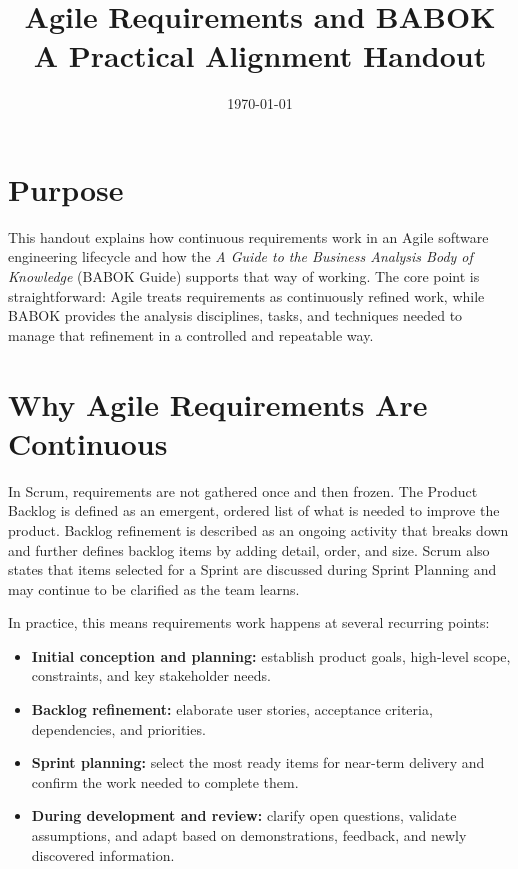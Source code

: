 \documentclass[11pt]{article}
\title{Agile Requirements and BABOK\\\large A Practical Alignment Handout}
\author{}
\date{\today}
\begin{document}
\maketitle

\section{Purpose}

This handout explains how continuous requirements work in an Agile software engineering lifecycle and how the \emph{A Guide to the Business Analysis Body of Knowledge} (BABOK Guide) supports that way of working. The core point is straightforward: Agile treats requirements as continuously refined work, while BABOK provides the analysis disciplines, tasks, and techniques needed to manage that refinement in a controlled and repeatable way.\cite{scrumguide,babokmain,babokstructure}

\section{Why Agile Requirements Are Continuous}

In Scrum, requirements are not gathered once and then frozen. The Product Backlog is defined as an emergent, ordered list of what is needed to improve the product. Backlog refinement is described as an ongoing activity that breaks down and further defines backlog items by adding detail, order, and size. Scrum also states that items selected for a Sprint are discussed during Sprint Planning and may continue to be clarified as the team learns.\cite{scrumguide}

In practice, this means requirements work happens at several recurring points:

\begin{itemize}
  \item \textbf{Initial conception and planning:} establish product goals, high-level scope, constraints, and key stakeholder needs.
  \item \textbf{Backlog refinement:} elaborate user stories, acceptance criteria, dependencies, and priorities.
  \item \textbf{Sprint planning:} select the most ready items for near-term delivery and confirm the work needed to complete them.
  \item \textbf{During development and review:} clarify open questions, validate assumptions, and adapt based on demonstrations, feedback, and newly discovered information.
\end{itemize}
\end{document}
